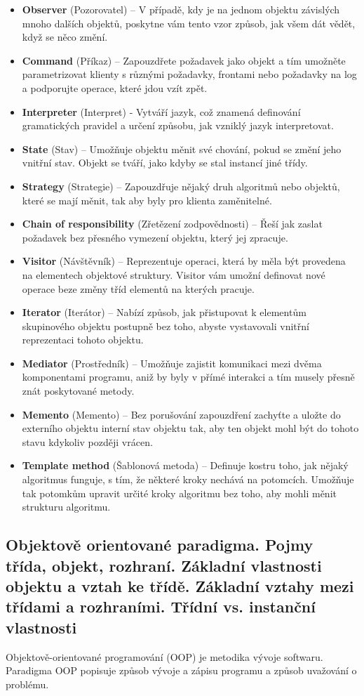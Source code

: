 \documentclass[10pt,a4paper]{article}
\begin{document}
\begin{itemize}
\item \textbf{Observer} (Pozorovatel) – V případě, kdy je na jednom objektu závislých mnoho dalších objektů, poskytne vám tento vzor způsob, jak všem dát vědět, když se něco změní.
\item \textbf{Command} (Příkaz) – Zapouzdřete požadavek jako objekt a tím umožněte parametrizovat klienty s různými požadavky, frontami nebo požadavky na log a podporujte operace, které jdou vzít zpět.
\item \textbf{Interpreter} (Interpret) - Vytváří jazyk, což znamená definování gramatických pravidel a určení způsobu, jak vzniklý jazyk interpretovat.
\item \textbf{State} (Stav) – Umožňuje objektu měnit své chování, pokud se změní jeho vnitřní stav. Objekt se tváří, jako kdyby se stal instancí jiné třídy.
\item \textbf{Strategy} (Strategie) – Zapouzdřuje nějaký druh algoritmů nebo objektů, které se mají měnit, tak aby byly pro klienta zaměnitelné.
\item \textbf{Chain of responsibility }(Zřetězení zodpovědnosti) – Řeší jak zaslat požadavek bez přesného vymezení objektu, který jej zpracuje.
\item \textbf{Visitor} (Návštěvník) – Reprezentuje operaci, která by měla být provedena na elementech objektové struktury. Visitor vám umožní definovat nové operace beze změny tříd elementů na kterých pracuje.
\item \textbf{Iterator} (Iterátor) – Nabízí způsob, jak přistupovat k elementům skupinového objektu postupně bez toho, abyste vystavovali vnitřní reprezentaci tohoto objektu.
\item \textbf{Mediator} (Prostředník) – Umožňuje zajistit komunikaci mezi dvěma komponentami programu, aniž by byly v přímé interakci a tím musely přesně znát poskytované metody.
\item \textbf{Memento} (Memento) – Bez porušování zapouzdření zachyťte a uložte do externího objektu interní stav objektu tak, aby ten objekt mohl být do tohoto stavu kdykoliv později vrácen.
\item \textbf{Template method} (Šablonová metoda) – Definuje kostru toho, jak nějaký algoritmus funguje, s tím, že některé kroky nechává na potomcích. Umožňuje tak potomkům upravit určité kroky algoritmu bez toho, aby mohli měnit strukturu algoritmu.
\end{itemize}

\subsection{Objektově orientované paradigma. Pojmy třída, objekt, rozhraní. Základní vlastnosti objektu a vztah ke třídě. Základní vztahy mezi třídami a rozhraními. Třídní vs. instanční vlastnosti}
Objektově-orientované programování (OOP) je metodika vývoje softwaru. Paradigma OOP popisuje způsob vývoje a zápisu programu a způsob uvažování o problému. 
\end{document}
